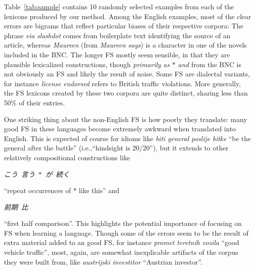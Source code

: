 \documentclass[11pt,letterpaper]{article}
\makeatletter
\def \ie {i.e.,\@ }
\newcommand{\gap}{$*$\xspace}
\newcommand{\ex}[1]{\textit{#1}\xspace}
\newcommand{\gl}[1]{``#1''\xspace}
\newcommand{\tabref}[2][]{Table#1~\ref{#2}\xspace}
\makeatother
\begin{document}
\tabref{tab:sample} contains 10 randomly selected examples from each of the lexicons produced by our method. Among the English examples, most of the clear errors are bigrams that reflect particular biases of their respective corpora: The phrase \ex{via slashdot} comes from boilerplate text identifying the source of an article, whereas \ex{Maureen} (from \ex{Maureen says}) is a character in one of the novels included in the BNC. The longer FS mostly seem sensible, in that they are plausible lexicalized constructions, though \ex{primarily as \gap and} from the BNC is not obviously an FS and likely the result of noise. Some FS are dialectal variants, for instance \ex{license endorsed} refers to British traffic violations. More generally, the FS lexicons created by these two corpora are quite distinct, sharing less than 50\% of their entries.

One striking thing about the non-English FS is how poorly they translate: many good FS in these languages become extremely awkward when translated into English. This is expected of course for idioms like \ex{biti general poslije bitke} \gl{be the general after the battle} (\ie \gl{hindsight is 20/20}), but it extends to other relatively compositional  constructions like 
\begin{CJK*}{UTF8}{min} \ex{こう\ 言う\ \gap\ が\ 続く} \end{CJK*} \gl{repeat occurrences of \gap like this} and 
\begin{CJK*}{UTF8}{min} \ex{前期\ 比} \end{CJK*} 
\gl{first half comparison}. This highlights the potential importance of focusing on FS when learning a language. Though some of the errors seem to be the result of extra material added to an good FS, for instance \ex{promet teretnih vozila} \gl{good vehicle traffic}, most, again, are somewhat inexplicable artifacts of the corpus they were built from, like \ex{austrijski investitor} \gl{Austrian investor}.
\end{document}

